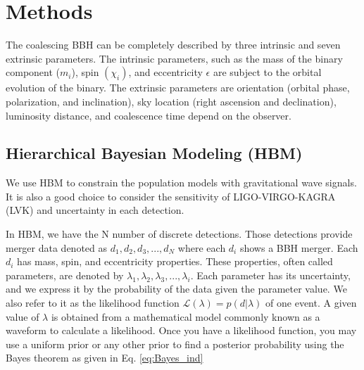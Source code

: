 \documentclass[twocolumn,prd,nofootinbib]{revtex4}
\begin{document}





\section{Methods}
\label{sec:methods}

The coalescing BBH can be completely described by three intrinsic and seven extrinsic parameters. The intrinsic parameters, such as the mass of the binary component ($m_i$), spin $( \chi_i)$, and eccentricity $\epsilon$  are subject to the orbital evolution of the binary. The extrinsic parameters are orientation (orbital phase, polarization, and inclination), sky location (right ascension and declination), luminosity distance, and coalescence time depend on the observer.



\subsection{Hierarchical Bayesian Modeling (HBM)}


We use HBM to constrain the population models with gravitational wave signals. It is also a good choice to consider the sensitivity of LIGO-VIRGO-KAGRA (LVK) and uncertainty in each detection.

In HBM, we have the N number of discrete detections. Those detections provide merger data denoted as $d_1,d_2,d_3,...,d_N$ where each $d_i$ shows a BBH merger. Each $d_i$ has mass, spin, and eccentricity properties. These properties, often called parameters, are denoted by $\lambda_1,\lambda_2,\lambda_3,...,\lambda_i$. Each parameter has its uncertainty, and we express it by the probability of the data given the parameter value. We also refer to it as the likelihood function $\mathcal{L}(\lambda)=p(d|\lambda)$ of one event. A given value of $\lambda$ is obtained from a mathematical model commonly known as a waveform to calculate a likelihood. Once you have a likelihood function, you may use a uniform prior or any other prior to find a posterior probability using the Bayes theorem as given in Eq. \ref{eq:Bayes_ind}
\end{document}
